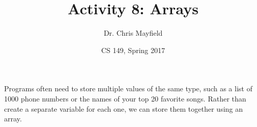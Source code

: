 \documentclass[12pt]{article}
\title{Activity 8: Arrays}
\author{Dr. Chris Mayfield}
\date{CS 149, Spring 2017}
\begin{document}
\maketitle

Programs often need to store multiple values of the same type, such as a list of 1000 phone numbers or the names of your top 20 favorite songs.
Rather than create a separate variable for each one, we can store them together using an array.




\end{document}
